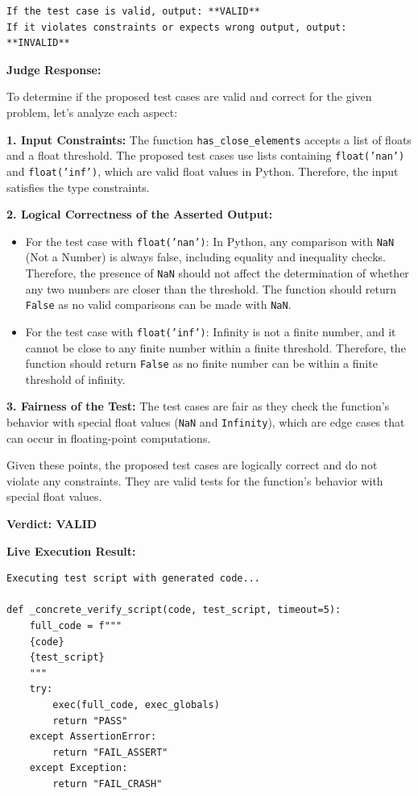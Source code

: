 \documentclass[11pt]{article}
\begin{document}
\begin{tcolorbox}[breakable, colback=white, colframe=black!70, boxrule=0.5pt, arc=2pt, left=4mm, right=4mm, top=3mm, bottom=3mm]
\begin{verbatim}
If the test case is valid, output: **VALID**
If it violates constraints or expects wrong output, output: **INVALID**
\end{verbatim}

\textbf{Judge Response:}

To determine if the proposed test cases are valid and correct for the given problem, let's analyze each aspect:

\textbf{1. Input Constraints:} The function \texttt{has\_close\_elements} accepts a list of floats and a float threshold. The proposed test cases use lists containing \texttt{float('nan')} and \texttt{float('inf')}, which are valid float values in Python. Therefore, the input satisfies the type constraints.

\textbf{2. Logical Correctness of the Asserted Output:}
\begin{itemize}
    \item For the test case with \texttt{float('nan')}: In Python, any comparison with \texttt{NaN} (Not a Number) is always false, including equality and inequality checks. Therefore, the presence of \texttt{NaN} should not affect the determination of whether any two numbers are closer than the threshold. The function should return \texttt{False} as no valid comparisons can be made with \texttt{NaN}.
    \item For the test case with \texttt{float('inf')}: Infinity is not a finite number, and it cannot be close to any finite number within a finite threshold. Therefore, the function should return \texttt{False} as no finite number can be within a finite threshold of infinity.
\end{itemize}

\textbf{3. Fairness of the Test:} The test cases are fair as they check the function's behavior with special float values (\texttt{NaN} and \texttt{Infinity}), which are edge cases that can occur in floating-point computations.

Given these points, the proposed test cases are logically correct and do not violate any constraints. They are valid tests for the function's behavior with special float values.

\textbf{Verdict: VALID}

\vspace{0.3cm}

\textbf{Live Execution Result:}
\begin{verbatim}
Executing test script with generated code...

def _concrete_verify_script(code, test_script, timeout=5):
    full_code = f"""
    {code}
    {test_script}
    """
    try:
        exec(full_code, exec_globals)
        return "PASS"
    except AssertionError:
        return "FAIL_ASSERT"
    except Exception:
        return "FAIL_CRASH"


\end{verbatim}
\end{tcolorbox}
\end{document}
